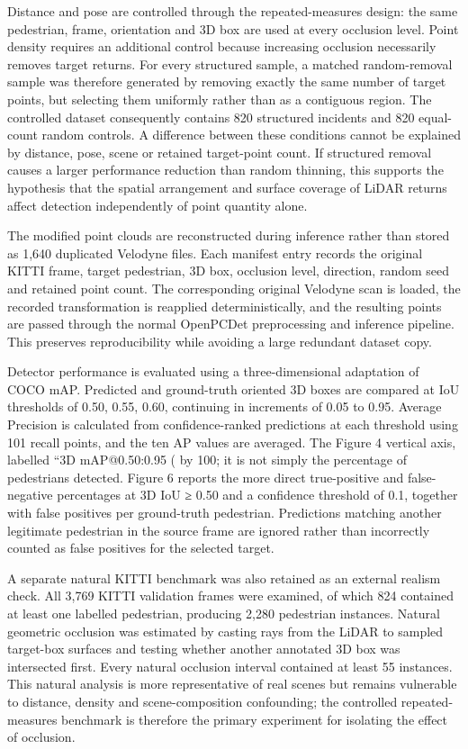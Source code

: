  Distance and pose are controlled through the repeated-measures design: the same pedestrian, frame, orientation and
 3D box are used at every occlusion level. Point density requires an additional control because increasing occlusion
 necessarily removes target returns. For every structured sample, a matched random-removal sample was therefore
 generated by removing exactly the same number of target points, but selecting them uniformly rather than as a
 contiguous region. The controlled dataset consequently contains 820 structured incidents and 820 equal-count random
 controls. A difference between these conditions cannot be explained by distance, pose, scene or retained
 target-point count. If structured removal causes a larger performance reduction than random thinning, this supports
 the hypothesis that the spatial arrangement and surface coverage of LiDAR returns affect detection independently of
 point quantity alone.

 The modified point clouds are reconstructed during inference rather than stored as 1,640 duplicated Velodyne files.
 Each manifest entry records the original KITTI frame, target pedestrian, 3D box, occlusion level, direction, random
 seed and retained point count. The corresponding original Velodyne scan is loaded, the recorded transformation is
 reapplied deterministically, and the resulting points are passed through the normal OpenPCDet preprocessing and
 inference pipeline. This preserves reproducibility while avoiding a large redundant dataset copy.

 Detector performance is evaluated using a three-dimensional adaptation of COCO mAP. Predicted and ground-truth
 oriented 3D boxes are compared at IoU thresholds of 0.50, 0.55, 0.60, continuing in increments of 0.05 to 0.95.
 Average Precision is calculated from confidence-ranked predictions at each threshold using 101 recall points, and
 the ten AP values are averaged. The Figure 4 vertical axis, labelled “3D mAP@0.50:0.95 (%
 by 100; it is not simply the percentage of pedestrians detected. Figure 6 reports the more direct true-positive and
 false-negative percentages at 3D IoU ≥ 0.50 and a confidence threshold of 0.1, together with false positives per
 ground-truth pedestrian. Predictions matching another legitimate pedestrian in the source frame are ignored rather
 than incorrectly counted as false positives for the selected target.

 A separate natural KITTI benchmark was also retained as an external realism check. All 3,769 KITTI validation frames
 were examined, of which 824 contained at least one labelled pedestrian, producing 2,280 pedestrian instances.
 Natural geometric occlusion was estimated by casting rays from the LiDAR to sampled target-box surfaces and testing
 whether another annotated 3D box was intersected first. Every natural occlusion interval contained at least 55
 instances. This natural analysis is more representative of real scenes but remains vulnerable to distance, density
 and scene-composition confounding; the controlled repeated-measures benchmark is therefore the primary experiment
 for isolating the effect of occlusion.

